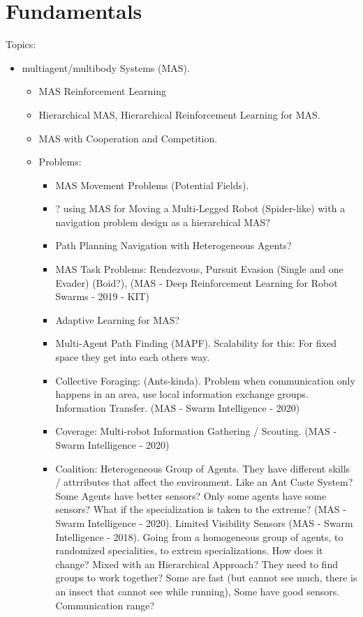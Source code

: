 
\chapter{Fundamentals}
\label{ch:Fundamentals}

Topics:
\begin{itemize}[noitemsep,nolistsep]
	\item multiagent/multibody Systems (MAS).
	\begin{itemize}[noitemsep,nolistsep]
		\item MAS Reinforcement Learning
		\item Hierarchical MAS, Hierarchical Reinforcement Learning for MAS.
		\item MAS with Cooperation and Competition.
		\item Problems:
		\begin{itemize}[noitemsep,nolistsep]
			\item MAS Movement Problems (Potential Fields).
			\item ? using MAS for Moving a Multi-Legged Robot (Spider-like) with a navigation problem design as a hierarchical MAS?
			\item Path Planning Navigation with Heterogeneous Agents?
			\item MAS Task Problems: Rendezvous, Pursuit Evasion (Single and one Evader) (Boid?), (MAS - Deep Reinforcement Learning for Robot Swarms - 2019 - KIT)
			\item Adaptive Learning for MAS?
			\item Multi-Agent Path Finding (MAPF). Scalability for this: For fixed space they get into each others way.
			\item Collective Foraging: (Ants-kinda). Problem when communication only happens in an area, use local information exchange groups. Information Transfer. (MAS - Swarm Intelligence - 2020)
			\item Coverage: Multi-robot Information Gathering / Scouting. (MAS - Swarm Intelligence - 2020)
			\item Coalition: Heterogeneous Group of Agents. They have different skills / attrributes that affect the environment. Like an Ant Caste System? Some Agents have better sensors? Only some agents have some sensors? What if the specialization is taken to the extreme? (MAS - Swarm Intelligence - 2020). Limited Visibility Sensors (MAS - Swarm Intelligence - 2018). Going from a homogeneous group of agents, to randomized specialities, to extrem specializations. How does it change? Mixed with an Hierarchical Approach? They need to find groups to work together? Some are fast (but cannot see much, there is an insect that cannot see while running), Some have good sensors. Communication range?

\end{itemize}
\end{itemize}
\end{itemize}
